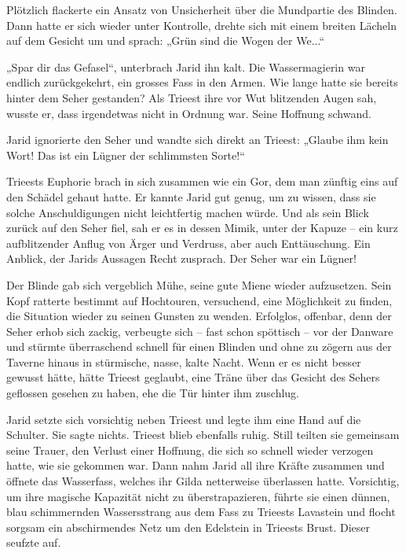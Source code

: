 \documentclass[10pt, a4paper, oneside]{book}
\begin{document}
Plötzlich flackerte ein Ansatz von Unsicherheit über die Mundpartie des Blinden. Dann hatte er sich wieder unter Kontrolle, drehte sich mit einem breiten Lächeln auf dem Gesicht um und sprach: „Grün sind die Wogen der We...“

„Spar dir das Gefasel“, unterbrach Jarid ihn kalt. Die Wassermagierin war endlich zurückgekehrt, ein grosses Fass in den Armen. Wie lange hatte sie bereits hinter dem Seher gestanden? Als Trieest ihre vor Wut blitzenden Augen sah, wusste er, dass irgendetwas nicht in Ordnung war. Seine Hoffnung schwand.

Jarid ignorierte den Seher und wandte sich direkt an Trieest: „Glaube ihm kein Wort! Das ist ein Lügner der schlimmsten Sorte!“

Trieests Euphorie brach in sich zusammen wie ein Gor, dem man zünftig eins auf den Schädel gehaut hatte. Er kannte Jarid gut genug, um zu wissen, dass sie solche Anschuldigungen nicht leichtfertig machen würde. Und als sein Blick zurück auf den Seher fiel, sah er es in dessen Mimik, unter der Kapuze – ein kurz aufblitzender Anflug von Ärger und Verdruss, aber auch Enttäuschung. Ein Anblick, der Jarids Aussagen Recht zusprach. Der Seher war ein Lügner!

Der Blinde gab sich vergeblich Mühe, seine gute Miene wieder aufzusetzen. Sein Kopf ratterte bestimmt auf Hochtouren, versuchend, eine Möglichkeit zu finden, die Situation wieder zu seinen Gunsten zu wenden. Erfolglos, offenbar, denn der Seher erhob sich zackig, verbeugte sich – fast schon spöttisch – vor der Danware und stürmte überraschend schnell für einen Blinden und ohne zu zögern aus der Taverne hinaus in stürmische, nasse, kalte Nacht. Wenn er es nicht besser gewusst hätte, hätte Trieest geglaubt, eine Träne über das Gesicht des Sehers geflossen gesehen zu haben, ehe die Tür hinter ihm zuschlug.\bigskip



Jarid setzte sich vorsichtig neben Trieest und legte ihm eine Hand auf die Schulter. Sie sagte nichts. Trieest blieb ebenfalls ruhig. Still teilten sie gemeinsam seine Trauer, den Verlust einer Hoffnung, die sich so schnell wieder verzogen hatte, wie sie gekommen war. Dann nahm Jarid all ihre Kräfte zusammen und öffnete das Wasserfass, welches ihr Gilda netterweise überlassen hatte. Vorsichtig, um ihre magische Kapazität nicht zu überstrapazieren, führte sie einen dünnen, blau schimmernden Wassersstrang aus dem Fass zu Trieests Lavastein und flocht sorgsam ein abschirmendes Netz um den Edelstein in Trieests Brust. Dieser seufzte auf.
\end{document}
